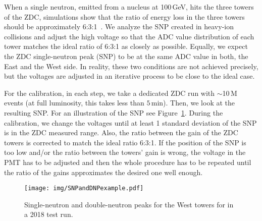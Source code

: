 When a single neutron, emitted from a nucleus at 100$\,$GeV, hits the three towers of the ZDC, simulations show that the ratio of energy loss
in the three towers should be 
approximately 6:3:1~\cite{ZDCphysics}\@. We analyze the SNP created in heavy-ion collisions and adjust the high voltage so that the ADC value 
distribution of each tower matches the ideal ratio of 6:3:1 as closely as possible. Equally, we expect the ZDC 
single-neutron peak (SNP) to
be at the same ADC value in both, the East and the West side. In reality, these two conditions are not achieved precisely, but the voltages are adjusted in an iterative process to be close to the ideal case.



% 



For the calibration, in each step, we take a dedicated ZDC run with
$\sim$10$\,$M events (at full luminosity, this takes less than $5\,$min). Then, we
look at the resulting SNP\@.
For an illustration of the SNP see Figure~\ref{SNPillustration}\@.
During the calibration, we change the voltages until at least 1 standard deviation of the SNP is in the ZDC measured
range. Also, the ratio between the gain of the ZDC towers is corrected to match the ideal ratio 6:3:1\@. If the position of the SNP is too low and/or the ratio between the towers' gain is wrong,
the voltage in the PMT has to be adjusted and then the whole procedure
has to be repeated until the ratio of the gains approximates the desired one well enough.


\begin{figure}[!htb]
\begin{center}
\texttt{[image: img/SNPandDNPexample.pdf]}
\end{center}
\caption[ Single-neutron and double-neutron peaks for the West towers for in a 2018 test run.]{\label{SNPillustration} Single-neutron and double-neutron peaks for the West towers for in a 2018 test run.}

\end{figure}

